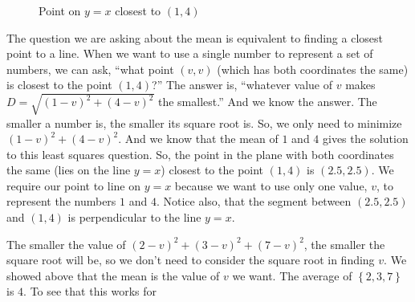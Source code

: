 \documentclass[10pt,]{book}
\theoremstyle{ptxdefinitionnotitle}
\theoremstyle{ptxdefinitiontitle}
\numberwithin{equation}{section}
\begin{document}
\begin{example}[{.}]
\begin{figure}
\centering
{
}
\caption{Point on \(y = x\) closest to \(\left( 1, 4 \right)\)\label{point-closest-to-1-4}}
\end{figure}
\hypertarget{p-73}{}%
The question we are asking about the mean is equivalent to finding a closest point to a line. When we want to use a single number to represent a set of numbers, we can ask, ``what point \(\left( v, v \right)\) (which has both coordinates the same) is closest to the point \(\left( 1, 4 \right)\)?'' The answer is, ``whatever value of \(v\) makes \(D = \sqrt {{{\left( {1 - v} \right)}^2} + {{\left( {4 - v} \right)}^2}}\) the smallest.'' And we know the answer. The smaller a number is, the smaller its square root is. So, we only need to minimize \({{\left( {1 - v} \right)}^2} + {{\left( {4 - v} \right)}^2}\). And we know that the mean of \(1\) and \(4\) gives the solution to this least squares question. So, the point in the plane with both coordinates the same (lies on the line \(y = x\)) closest to the point \(\left( 1, 4 \right)\) is \(\left( 2.5, 2.5 \right)\). We require our point to line on \(y = x\) because we want to use only one value, \(v\), to represent the numbers \(1\) and \(4\). Notice also, that the segment between \(\left( 2.5, 2.5 \right)\) and \(\left( 1, 4 \right)\) is perpendicular to the line \(y = x\). \\%
\par
\hypertarget{p-74}{}%
The smaller the value of \({\left( {2 - v} \right)^2} + {\left( {3 - v} \right)^2} + {\left( {7 - v} \right)^2}\), the smaller the square root will be, so we don’t need to consider the square root in finding \(v\). We showed above that the mean is the value of \(v\) we want. The average of \(\left\{ {2,3,7} \right\}\) is \(4\). To see that this works for%

\end{example}
\end{document}
